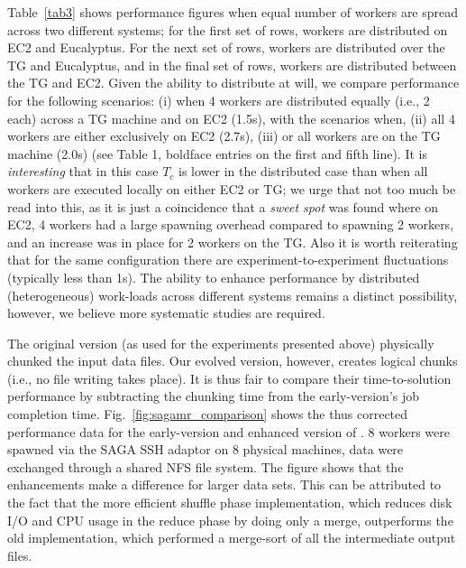 \documentclass[3p,twocolumn]{elsarticle}
\begin{document}
Table~\ref{tab3} shows performance figures when equal number of workers are
spread across two different systems; for the first set of rows,
workers are distributed on EC2 and Eucalyptus. For the next set of
rows, workers are distributed over the TG and Eucalyptus, and in the
final set of rows, workers are distributed between the TG and EC2.
Given the ability to distribute at will, we compare performance for
the following scenarios: (i) when 4 workers are distributed equally
(i.e., 2 each) across a TG machine and on EC2 (1.5s), with the
scenarios when, (ii) all 4 workers are either exclusively on EC2
(2.7s), (iii) or all workers are on the TG machine (2.0s) (see Table
1, boldface entries on the first and fifth line). It is {\it
  interesting} that in this case $T_c$ is lower in the distributed
case than when all workers are executed locally on either EC2 or TG;
we urge that not too much be read into this, as it is just a
coincidence that a {\it sweet spot} was found where on EC2, 4 workers
had a large spawning overhead compared to spawning 2 workers, and an
increase was in place for 2 workers on the TG. Also it is worth
reiterating that for the same configuration there are
experiment-to-experiment fluctuations (typically less than 1s).  The
ability to enhance performance by distributed (heterogeneous)
work-loads across different systems remains a distinct possibility,
however, we believe more systematic studies are required.



The original \sagamapreduce version (as used for the experiments
presented above) physically chunked the input data files.  Our evolved
version, however, creates logical chunks (i.e., no file
writing takes place).  It is thus fair to compare their
time-to-solution performance by subtracting the chunking time from the
early-version's job completion time.  Fig.~\ref{fig:sagamr_comparison}
shows the thus corrected performance data for the early-version and
enhanced version of \sagamapreduce.  8 workers were spawned via the
SAGA SSH adaptor on 8 physical machines,  data were exchanged through
a shared NFS file system.  The figure shows that the \sagamapreduce
enhancements make a difference for larger data sets.  This can be
attributed to the fact that the more efficient shuffle phase
implementation, which reduces disk I/O and CPU usage in the reduce
phase by doing only a merge, outperforms the old implementation, which
performed a merge-sort of all the intermediate output files.
\end{document}
